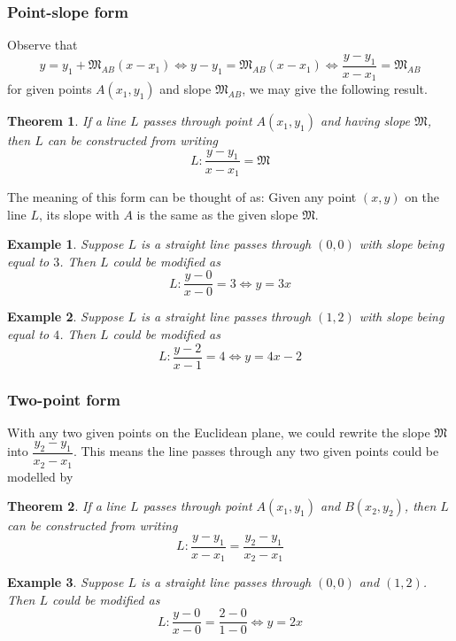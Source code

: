 \documentclass[12pt]{article}
\newtheorem*{theorem}{Theorem}
\newtheorem*{example}{Example}
\begin{document}
    \subsubsection{Point-slope form}

    Observe that $$y=y_1+\mathfrak{M}_{AB}(x-x_1) \iff y-y_1=\mathfrak{M}_{AB}(x-x_1) \iff \frac{y-y_1}{x-x_1}=\mathfrak{M}_{AB}$$ for given points $A(x_1,y_1)$ and slope $\mathfrak{M}_{AB}$, we may give the following result.

    \begin{theorem}
        If a line $L$ passes through point $A(x_1,y_1)$ and having slope $\mathfrak{M}$, then $L$ can be constructed from writing $$L:\frac{y-y_1}{x-x_1}=\mathfrak{M}$$
    \end{theorem}

    The meaning of this form can be thought of as: Given any point $(x,y)$ on the line $L$, its slope with $A$ is the same as the given slope $\mathfrak{M}$.

    \begin{example}
        Suppose $L$ is a straight line passes through $(0,0)$ with slope being equal to $3$. Then $L$ could be modified as $$L:\frac{y-0}{x-0}=3\iff y=3x$$
    \end{example}
    
    \begin{example}
        Suppose $L$ is a straight line passes through $(1,2)$ with slope being equal to $4$. Then $L$ could be modified as $$L:\frac{y-2}{x-1}=4\iff y=4x-2$$
    \end{example}

    \subsubsection{Two-point form}

    With any two given points on the Euclidean plane, we could rewrite the slope $\mathfrak{M}$ into $\dfrac{y_2-y_1}{x_2-x_1}$. This means the line passes through any two given points could be modelled by 

    \begin{theorem}
        If a line $L$ passes through point $A(x_1,y_1)$ and $B(x_2,y_2)$, then $L$ can be constructed from writing $$L:\frac{y-y_1}{x-x_1}=\frac{y_2-y_1}{x_2-x_1}$$
    \end{theorem}

    \begin{example}
        Suppose $L$ is a straight line passes through $(0,0)$ and $(1,2)$. Then $L$ could be modified as $$L:\frac{y-0}{x-0}=\frac{2-0}{1-0}\iff y=2x$$
    \end{example}
    
\end{document}
